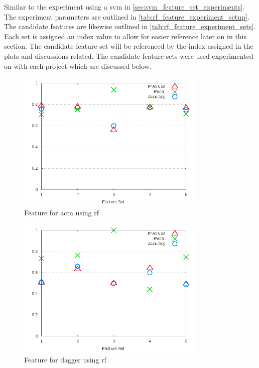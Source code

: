 Similar to the experiment using a \gls{svm} in \autoref{sec:svm_feature_set_experiments}. The experiment parameters are outlined in \autoref{tab:rf_feature_experiment_setup}. The candidate features are likewise outlined in \autoref{tab:rf_feature_experiment_sets}. Each set is assigned an index value to allow for easier reference later on in this section. The candidate feature set will be referenced by the index assigned in the plots and discussions related. The candidate feature sets were used experimented on with each project which are discussed below.

\begin{figure}[!t]
    \centering
        \includegraphics[width=0.8\textwidth]{images/rf/test_3/acra_sample_range}
        \caption{Feature for acra using \gls{rf}}
        \label{fig:test_3_acra_rf}
\end{figure}

\begin{figure}[!ht]
    \centering
        \includegraphics[width=0.8\textwidth]{images/rf/test_3/dagger_sample_range}
        \caption{Feature for dagger using \gls{rf}}
        \label{fig:test_3_dagger_rf}
\end{figure}

